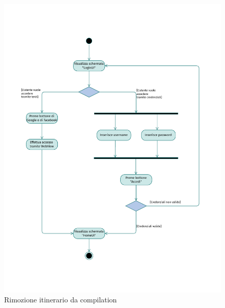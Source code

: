\documentclass{natourDoc}
\begin{document}
\newpage
\begin{figure}[!htbp]
	\centering
	\includegraphics[width=\textwidth, page=8]{./diagrams/activity.pdf}
	\caption{Rimozione itinerario da compilation}
\end{figure}
\FloatBarrier

\newpage
\end{document}
